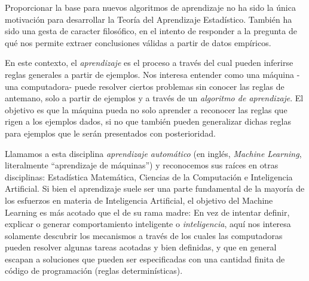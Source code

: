 \documentclass{report}
\begin{document}
Proporcionar la base para nuevos algoritmos de aprendizaje no ha sido la única motivación para desarrollar la Teoría del Aprendizaje 
Estadístico. También ha sido una gesta de caracter filosófico, en el intento de responder a la pregunta de qué nos permite extraer conclusiones válidas 
a partir de datos empíricos.  \newline


En este contexto, el \textit{aprendizaje} es el proceso a través del cual pueden inferirse reglas generales a partir de ejemplos. Nos interesa 
entender como una máquina -una computadora- puede resolver ciertos problemas sin conocer las reglas de antemano, solo a partir de ejemplos y a través
de un \textit{algoritmo de aprendizaje}. El objetivo es que la máquina pueda no solo aprender a reconocer las reglas que rigen a los ejemplos dados,
si no que también pueden generalizar dichas reglas para ejemplos que le serán presentados con posterioridad.\newline

Llamamos a esta disciplina \textit{aprendizaje automático} (en inglés, \textit{Machine Learning}, literalmente ``aprendizaje de máquinas'') y reconocemos
sus raíces en otras disciplinas: Estadística Matemática, Ciencias de la Computación e Inteligencia Artificial. Si bien el aprendizaje suele ser una
parte fundamental de la mayoría de los esfuerzos en materia de Inteligencia Artificial, el objetivo del Machine Learning es más acotado que el de su 
rama madre: En vez de intentar definir, explicar o generar comportamiento inteligente o \textit{inteligencia}, aquí nos interesa solamente descubrir los mecanismos
a través de los cuales las computadoras pueden resolver algunas tareas acotadas y bien definidas, y que en general escapan a soluciones que pueden
ser especificadas con una cantidad finita de código de programación (reglas determinísticas).\newline
\end{document}
